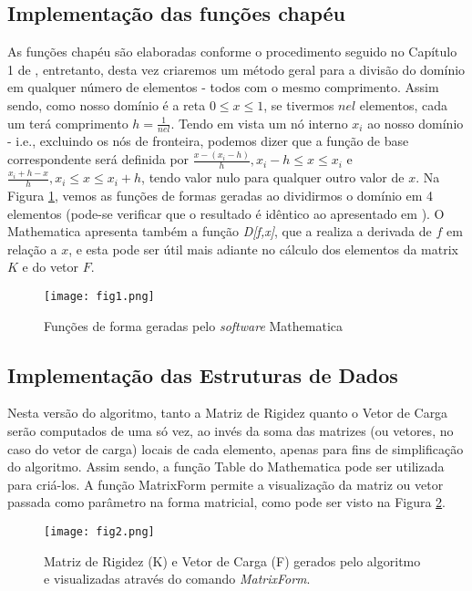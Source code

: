 \documentclass[11pt, oneside, hidelinks]{article}   	%
\begin{document}
\subsection{Implementação das funções chapéu}
As funções chapéu são elaboradas conforme o procedimento seguido no Capítulo 1 de \citet{oden81}, entretanto, desta vez criaremos um método geral para a divisão do domínio em qualquer número de elementos - todos com o mesmo comprimento. Assim sendo, como nosso domínio é a reta $0\leq x \leq1$, se tivermos $nel$ elementos, cada um terá comprimento $h=\frac{1}{nel}$. Tendo em vista um nó interno $x_{i}$ ao nosso domínio - i.e., excluindo os nós de fronteira, podemos dizer que a função de base correspondente será definida por $\frac{x-(x_{i}-h)}{h},x_{i}-h \leq x\leq x_{i}$ e $\frac{x_{i}+h-x}{h},x_{i}\leq x \leq x_{i}+h$, tendo valor nulo para qualquer outro valor de $x$. Na Figura \ref{fig:Funcoes-de-forma-Math-1}, vemos as funções de formas geradas ao dividirmos o domínio em 4 elementos (pode-se verificar que o resultado é idêntico ao apresentado em \citet{oden81}). O Mathematica apresenta também a função \emph{D[f,x]}, que a realiza a derivada de $f$ em relação a $x$, e esta pode ser útil mais adiante no cálculo dos elementos da matrix $K$ e do vetor $F$.
\begin{figure}[h!]
  \centering
      \texttt{[image: fig1.png]}
  \caption{Funções de forma geradas pelo \emph{software} Mathematica}
  \label{fig:Funcoes-de-forma-Math-1}
\end{figure}

\subsection{Implementação das Estruturas de Dados}
Nesta versão do algoritmo, tanto a Matriz de Rigidez quanto o Vetor de Carga serão computados de uma só vez, ao invés da soma das matrizes (ou vetores, no caso do vetor de carga) locais de cada elemento, apenas para fins de simplificação do algoritmo. Assim sendo, a função Table do Mathematica pode ser utilizada para criá-los. A função MatrixForm permite a visualização da matriz ou vetor passada como parâmetro na forma matricial, como pode ser visto na Figura \ref{fig:math1matriz}.
\begin{figure}[h!]
  \centering
      \texttt{[image: fig2.png]}
  \caption{Matriz de Rigidez (K) e Vetor de Carga (F) gerados pelo algoritmo e visualizadas através do comando \emph{MatrixForm}.}
  \label{fig:math1matriz}
\end{figure}
\end{document}

